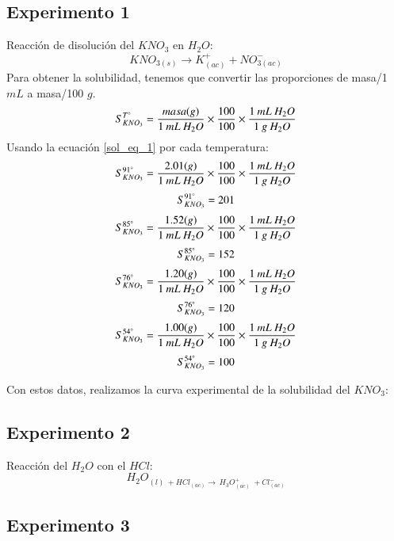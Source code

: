 \documentclass[../main.tex]{subfiles}
\begin{document}
\subsection{Experimento 1}
Reacción de disolución del $KNO_3$ en $H_2O$:
\[ KNO_{3(s)} \rightarrow K^+_{(ac)} + NO^-_{3(ac)} \]
Para obtener la solubilidad, tenemos que convertir las proporciones 
de masa/1 $mL$ a masa/100 $g$.
\begin{equation} \label{sol_eq_1}
    S^{T\degree}_{KNO_3} = \frac{masa (g)}{1\:mL\:H_2O} \times \frac{100}{100} \times \frac{1\:mL\:H_2O}{1\:g\:H_2O}
\end{equation}
Usando la ecuación \ref{sol_eq_1} por cada temperatura:
\[
    S^{91\degree}_{KNO_3} = \frac{2.01 (g)}{1\:mL\:H_2O} \times \frac{100}{100} \times \frac{1\:mL\:H_2O}{1\:g\:H_2O}
\]
\[
    S^{91\degree}_{KNO_3} = 201
\]\[
    S^{85\degree}_{KNO_3} = \frac{1.52 (g)}{1\:mL\:H_2O} \times \frac{100}{100} \times \frac{1\:mL\:H_2O}{1\:g\:H_2O}
\]
\[
    S^{85\degree}_{KNO_3} = 152
\]\[
    S^{76\degree}_{KNO_3} = \frac{1.20 (g)}{1\:mL\:H_2O} \times \frac{100}{100} \times \frac{1\:mL\:H_2O}{1\:g\:H_2O}
\]
\[
    S^{76\degree}_{KNO_3} = 120
\]\[
    S^{54\degree}_{KNO_3} = \frac{1.00 (g)}{1\:mL\:H_2O} \times \frac{100}{100} \times \frac{1\:mL\:H_2O}{1\:g\:H_2O}
\]
\[
    S^{54\degree}_{KNO_3} = 100
\]

Con estos datos, realizamos la curva experimental de la solubilidad del $KNO_3$:
\bigskip
\begin{center} 
\end{center}

\subsection{Experimento 2}

Reacción del $H_2O$ con el $HCl$:
\[H_2O_{(l) \: + HCl_{(ac)} \rightarrow \: H_3O^+_{(ac)} \: + Cl^-_{(ac)}} \]

\subsection{Experimento 3}
\end{document}
